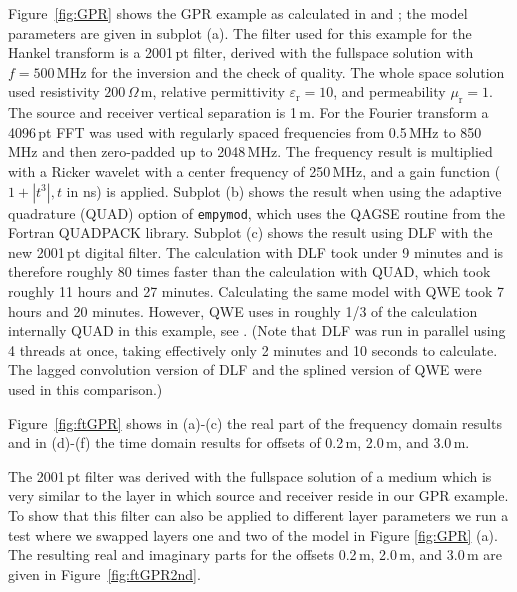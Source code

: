 \documentclass[paper,twocolumn,twoside]{geophysics}
\newcommand{\mr}[1]{\mathrm{#1}}
\begin{document}
Figure~\ref{fig:GPR} shows the GPR example as calculated in
\cite{GEO.15.Hunziker} and \cite{GEO.17.Werthmuller}; the model parameters are
given in subplot (a). The filter used for this example for the Hankel transform
is a 2001\,pt filter, derived with the fullspace solution with $f=500\,$MHz for
the inversion and the check of quality. The whole space solution used
resistivity $200\,\Omega\,$m, relative permittivity $\varepsilon_\mr{r}=10$,
and permeability $\mu_\mr{r}=1$. The source and receiver vertical separation is
1\,m. For the Fourier transform a 4096\,pt FFT was used with regularly spaced
frequencies from 0.5\,MHz to 850\,MHz and then zero-padded up to 2048\,MHz. The
frequency result is multiplied with a Ricker wavelet with a center frequency of
250\,MHz, and a gain function ($1 + |t^3|, t$ in ns) is applied. Subplot (b)
shows the result when using the adaptive quadrature (QUAD) option of
\texttt{empymod}, which uses the QAGSE routine from the Fortran QUADPACK
library. Subplot (c) shows the result using DLF with the new 2001\,pt digital
filter. The calculation with DLF took under 9 minutes and is therefore roughly
80 times faster than the calculation with QUAD, which took roughly 11 hours and
27 minutes. Calculating the same model with QWE took 7 hours and 20 minutes.
However, QWE uses in roughly 1/3 of the calculation internally QUAD in this
example, see \cite{GEO.17.Werthmuller}. (Note that DLF was run in parallel
using 4 threads at once, taking effectively only 2 minutes and 10 seconds to
calculate.
The lagged convolution version of DLF and the splined version of QWE were used
in this comparison.)
%
%

Figure~\ref{fig:ftGPR} shows in (a)-(c) the real part of the frequency domain
results and in (d)-(f) the time domain results for offsets of 0.2\,m, 2.0\,m,
and 3.0\,m.
%
%

The 2001\,pt filter was derived with the fullspace solution of a medium which
is very similar to the layer in which source and receiver reside in our GPR
example. To show that this filter can also be applied to different layer
parameters we run a test where we swapped layers one and two of the model in
Figure \ref{fig:GPR} (a). The resulting real and imaginary parts for the
offsets 0.2\,m, 2.0\,m, and 3.0\,m are given in Figure~\ref{fig:ftGPR2nd}.
%
%
\end{document}
